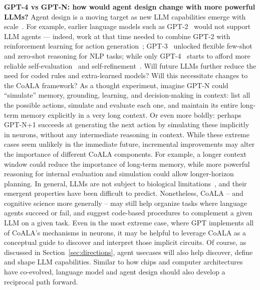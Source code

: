\documentclass[10pt]{article} %
\begin{document}
\textbf{GPT-4 vs GPT-N: how would agent design change with more powerful LLMs?} Agent design is a moving target as new LLM capabilities emerge with scale~\citep{wei2022emergent}.
For example, earlier language models such as GPT-2~\citep{radford2019language} would not support LLM agents --- indeed, work at that time needed to combine GPT-2 with reinforcement learning for action generation~\citep{yao2020keep}; GPT-3~\citep{brown2020language} unlocked flexible few-shot and zero-shot reasoning for NLP tasks; while only GPT-4~\citep{OpenAI2023GPT4TR} starts to afford more reliable self-evaluation~\citep{saunders2022selfcritique, shinn2023reflexion, yao2023tree} and self-refinement~\citep{madaan2023selfrefine, chen2023teaching}. 
Will future LLMs further reduce the need for coded rules and extra-learned models? Will this necessitate changes to the CoALA framework?
As a thought experiment, imagine GPT-N could ``simulate'' memory, grounding, learning, and decision-making in context: list all the possible actions, simulate and evaluate each one, and maintain its entire long-term memory explicitly in a very long context. Or even more boldly: perhaps GPT-N+1 succeeds at generating the next action by simulating these implicitly in neurons, without any intermediate reasoning in context. While these extreme cases seem unlikely in the immediate future, incremental improvements may alter the importance of different CoALA components. For example, a longer context window could reduce the importance of long-term memory, while more powerful reasoning for internal evaluation and simulation could allow longer-horizon planning. In general, LLMs are not subject to biological limitations~\citep{griffiths2020understanding}, and their emergent properties have been difficult to predict. Nonetheless, CoALA -- and cognitive science more generally -- may still help organize tasks where language agents succeed or fail, and suggest code-based procedures to complement a given LLM on a given task. Even in the most extreme case, where GPT implements all of CoALA's mechanisms in neurons, it may be helpful to leverage CoALA as a conceptual guide to discover and interpret those implicit circuits. 
Of course, as discussed in Section~\ref{sec:directions}, agent usecases will also help discover, define and shape LLM capabilities. Similar to how chips and computer architectures have co-evolved, language model and agent design should also develop a reciprocal path forward.
\end{document}
